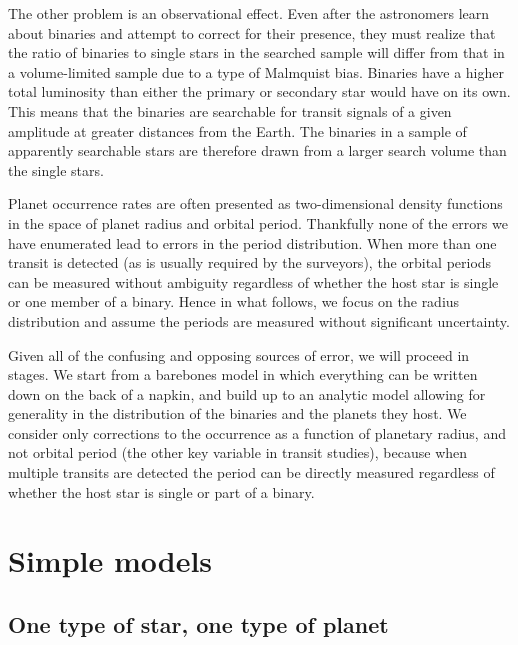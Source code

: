 \documentclass[12pt,modern]{aastex61}
\begin{document}
The other problem is an observational effect.  Even after the
astronomers learn about binaries and attempt to correct for their
presence, they must realize that the ratio of binaries to single stars
in the searched sample will differ from that in a volume-limited
sample due to a type of Malmquist bias.  Binaries have a higher total
luminosity than either the primary or secondary star would have on its
own.  This means that the binaries are searchable for transit signals
of a given amplitude at greater distances from the Earth.  The
binaries in a sample of apparently searchable stars are therefore
drawn from a larger search volume than the single stars.

Planet occurrence rates are often presented as two-dimensional density
functions in the space of planet radius and orbital period.
Thankfully none of the errors we have enumerated lead to errors in the
period distribution.  When more than one transit is detected (as is
usually required by the surveyors), the orbital periods can be
measured without ambiguity regardless of whether the host star is
single or one member of a binary.  Hence in what follows, we focus on
the radius distribution and assume the periods are measured without
significant uncertainty.

Given all of the confusing and opposing sources of error, we will
proceed in stages. We start from a barebones model in which everything
can be written down on the back of a napkin, and build up to an
analytic model allowing for generality in the distribution of the
binaries and the planets they host.  We consider only corrections to
the occurrence as a function of planetary radius, and not orbital
period (the other key variable in transit studies), because when
multiple transits are detected the period can be directly measured
regardless of whether the host star is single or part of a binary.


%

\section{Simple models}
\label{sec:simplest}

\subsection{One type of star, one type of planet}
\label{sec:model_1}
\end{document}
